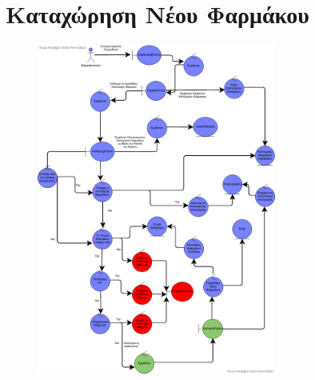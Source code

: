 \documentclass{article}
\begin{document}
\newpage

\section{Καταχώρηση Νέου Φαρμάκου}

\vspace{0.2cm}

\begin{figure}[!htb]
        \centering
        \includegraphics[width=0.7\textwidth]{Medicine Insertion.png}
\end{figure}
\end{document}
